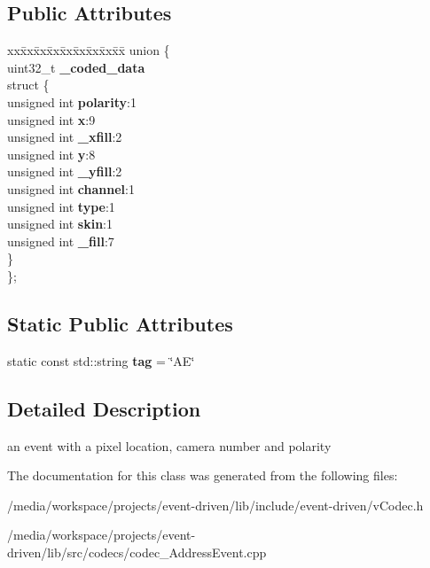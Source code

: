 \subsection*{Public Attributes}
\begin{DoxyCompactItemize}
\item 
\mbox{\label{classev_1_1AddressEvent_a359b9c530269e582a058112a34a48383}} 
\begin{tabbing}
xx\=xx\=xx\=xx\=xx\=xx\=xx\=xx\=xx\=\kill
union \{\\
\>uint32\_t {\bfseries \_coded\_data}\\
\mbox{\label{unionev_1_1AddressEvent_1_1_0D1_a51f7d79230871a81eca60e6fe852b2df}} 
\>struct \{\\
\>\>unsigned int {\bfseries polarity}:1\\
\>\>unsigned int {\bfseries x}:9\\
\>\>unsigned int {\bfseries \_xfill}:2\\
\>\>unsigned int {\bfseries y}:8\\
\>\>unsigned int {\bfseries \_yfill}:2\\
\>\>unsigned int {\bfseries channel}:1\\
\>\>unsigned int {\bfseries type}:1\\
\>\>unsigned int {\bfseries skin}:1\\
\>\>unsigned int {\bfseries \_fill}:7\\
\>\} \\
\}; \\

\end{tabbing}\end{DoxyCompactItemize}
\subsection*{Static Public Attributes}
\begin{DoxyCompactItemize}
\item 
\mbox{\label{classev_1_1AddressEvent_a9a2d3e863964a1247ae4203a4ad2c646}} 
static const std\+::string {\bfseries tag} = \char`\"{}AE\char`\"{}
\end{DoxyCompactItemize}


\subsection{Detailed Description}
an event with a pixel location, camera number and polarity 

The documentation for this class was generated from the following files\+:\begin{DoxyCompactItemize}
\item 
/media/workspace/projects/event-\/driven/lib/include/event-\/driven/v\+Codec.\+h\item 
/media/workspace/projects/event-\/driven/lib/src/codecs/codec\+\_\+\+Address\+Event.\+cpp\end{DoxyCompactItemize}
